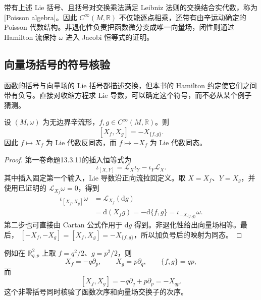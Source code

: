 带有上述 Lie 括号、且括号对交换乘法满足 Leibniz 法则的交换结合实代数，称为[Poisson algebra]。因此 \(C^\infty(M,\mathbb R)\) 不仅能逐点相乘，还带有由辛运动确定的 Poisson 代数结构。非退化性负责把函数微分变成唯一向量场，闭性则通过 Hamilton 流保持 \(\omega\) 进入 Jacobi 恒等式的证明。

\subsection{向量场括号的符号核验}
\label{g4:subsec:0902:02}

函数的括号与向量场的 Lie 括号都描述交换，但本书的 Hamilton 约定使它们之间带有负号。直接对收缩方程求 Lie 导数，可以确定这个符号，而不必从某个例子猜测。

\begin{proposition}\label{g4:prop:0902:hamiltonian-bracket}
	设 \((M,\omega)\) 为无边界辛流形，\(f,g\in C^\infty(M,\mathbb R)\)。则
	\begin{equation}\label{g4:eq:0902:hamiltonian-bracket}
		[X_f,X_g]=-X_{\{f,g\}}.
	\end{equation}
	因此 \(f\mapsto X_f\) 为 Lie 代数反同态，而 \(f\mapsto-X_f\) 为 Lie 代数同态。
\end{proposition}
\begin{proof}
	第一卷命题13.3.11的插入恒等式为
	\[
		\iota_{[X,Y]}=\mathcal L_X\iota_Y-\iota_Y\mathcal L_X.
	\]
	其中插入固定第一个输入，Lie 导数沿正向流拉回定义。取 \(X=X_f\)、\(Y=X_g\)，并使用已证明的 \(\mathcal L_{X_f}\omega=0\)，得到
	\[
		\begin{aligned}
			\iota_{[X_f,X_g]}\omega
			&=\mathcal L_{X_f}(\mathrm{d}g)\\
			&=\mathrm{d}(X_fg)
			=-\mathrm{d}\{f,g\}
			=\iota_{-X_{\{f,g\}}}\omega.
		\end{aligned}
	\]
	第二步也可直接由 Cartan 公式作用于 \(\mathrm{d}g\) 得到。非退化性给出向量场相等。最后，
	\([{-X_f},{-X_g}]=[X_f,X_g]=-X_{\{f,g\}}\)，所以加负号后的映射为同态。
\end{proof}

例如在 \(\mathbb R^2_{q,p}\) 上取 \(f=q^2/2\)、\(g=p^2/2\)，则
\[
	X_f=-q\partial_p,\qquad X_g=p\partial_q,\qquad
	\{f,g\}=qp,
\]
而
\[
	[X_f,X_g]=-q\partial_q+p\partial_p
	=-X_{qp}.
\]
这个非零括号同时核验了函数次序和向量场交换子的次序。

